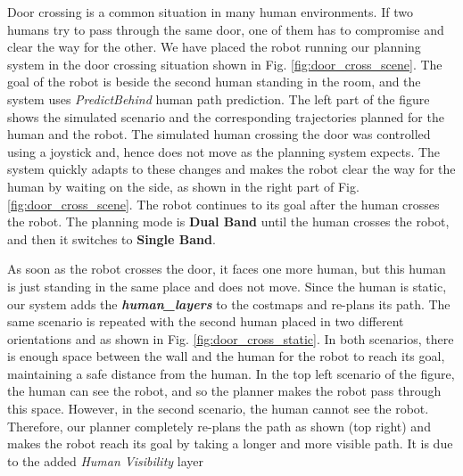 Door crossing is a common situation in many human environments. If two humans try to pass through the same door, one of them has to compromise and clear the way for the other. We have placed the robot running our planning system in the door crossing situation shown in Fig. \ref{fig:door_cross_scene}. The goal of the robot is beside the second human standing in the room, and the system uses \textit{PredictBehind} human path prediction. The left part of the figure shows the simulated scenario and the corresponding trajectories planned for the human and the robot. The simulated human crossing the door was controlled using a joystick and, hence does not move as the planning system expects. The system quickly adapts to these changes and makes the robot clear the way for the human by waiting on the side, as shown in the right part of Fig. \ref{fig:door_cross_scene}. The robot continues to its goal after the human crosses the robot. The planning mode is \textbf{Dual Band} until the human crosses the robot, and then it switches to \textbf{Single Band}.
 
As soon as the robot crosses the door, it faces one more human, but this human is just standing in the same place and does not move. Since the human is static, our system adds the \textit{\textbf{human\_layers}} to the costmaps and re-plans its path. The same scenario is repeated with the second human placed in two different orientations and as shown in Fig. \ref{fig:door_cross_static}. In both scenarios, there is enough space between the wall and the human for the robot to reach its goal, maintaining a safe distance from the human. In the top left scenario of the figure, the human can see the robot, and so the planner makes the robot pass through this space. However, in the second scenario, the human cannot see the robot. Therefore, our planner completely re-plans the path as shown (top right) and makes the robot reach its goal by taking a longer and more visible path. It is due to the added \textit{Human Visibility} layer

